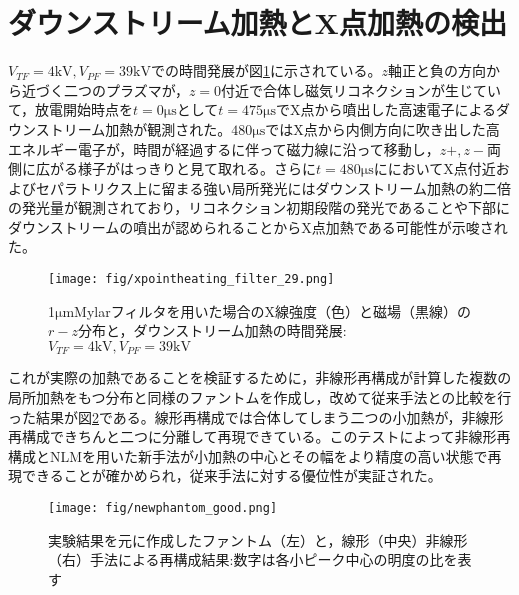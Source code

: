 \section{ダウンストリーム加熱とX点加熱の検出}
$V_{TF}=4\mathrm{kV}, V_{PF}=39\mathrm{kV}$での時間発展が図\ref{fig:xpoint_filter}に示されている。$z$軸正と負の方向から近づく二つのプラズマが，$z = 0$付近で合体し磁気リコネクションが生じていて，放電開始時点を$t = 0\mathrm{\mu s}$として$t = 475\mathrm{\mu s}$でX点から噴出した高速電子によるダウンストリーム加熱が観測された。$480\mathrm{\mu s}$ではX点から内側方向に吹き出した高エネルギー電子が，時間が経過するに伴って磁力線に沿って移動し，$z+, z-$両側に広がる様子がはっきりと見て取れる。さらに$t = 480\mathrm{\mu s}$ににおいてX点付近およびセパラトリクス上に留まる強い局所発光にはダウンストリーム加熱の約二倍の発光量が観測されており，リコネクション初期段階の発光であることや下部にダウンストリームの噴出が認められることからX点加熱である可能性が示唆された。
\begin{figure}[H]
   \centering
   \texttt{[image: fig/xpointheating\_filter\_29.png]}
   \caption{1$\mathrm{\mu m}$Mylarフィルタを用いた場合のX線強度（色）と磁場（黒線）の$r-z$分布と，ダウンストリーム加熱の時間発展:$V_{TF} = 4\mathrm{kV}, V_{PF}=39\mathrm{kV}$}
   \label{fig:xpoint_filter}
\end{figure}

これが実際の加熱であることを検証するために，非線形再構成が計算した複数の局所加熱をもつ分布と同様のファントムを作成し，改めて従来手法との比較を行った結果が図\ref{fig:newphantom}である。線形再構成では合体してしまう二つの小加熱が，非線形再構成できちんと二つに分離して再現できている。このテストによって非線形再構成とNLMを用いた新手法が小加熱の中心とその幅をより精度の高い状態で再現できることが確かめられ，従来手法に対する優位性が実証された。

\begin{figure}[H]
   \centering
   \texttt{[image: fig/newphantom\_good.png]}
   \caption{実験結果を元に作成したファントム（左）と，線形（中央）非線形（右）手法による再構成結果:数字は各小ピーク中心の明度の比を表す}
   \label{fig:newphantom}
\end{figure}